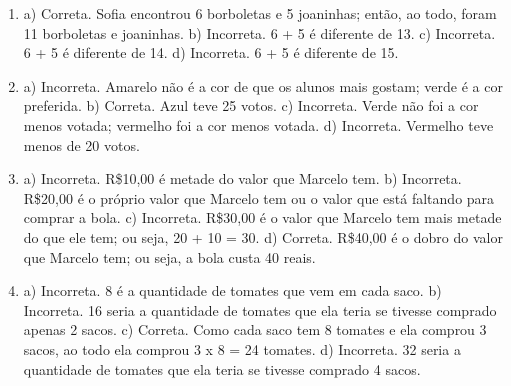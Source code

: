 \begin{enumerate}
\item
a) Correta. Sofia encontrou 6 borboletas e 5 joaninhas; então, ao todo, foram 11 borboletas e joaninhas.
b) Incorreta. 6 + 5 é diferente de 13.
c) Incorreta. 6 + 5 é diferente de 14.
d) Incorreta. 6 + 5 é diferente de 15.

\item
a) Incorreta. Amarelo não é a cor de que os alunos mais gostam; verde é a cor preferida.
b) Correta. Azul teve 25 votos.
c) Incorreta. Verde não foi a cor menos votada; vermelho foi a cor menos votada.
d) Incorreta. Vermelho teve menos de 20 votos.

\item
a) Incorreta. R\$10,00 é metade do valor que Marcelo tem.
b) Incorreta. R\$20,00 é o próprio valor que Marcelo tem ou o valor que
está faltando para comprar a bola.
c) Incorreta. R\$30,00 é o valor que Marcelo tem mais metade do que ele
tem; ou seja, 20 + 10 = 30.
d) Correta. R\$40,00 é o dobro do valor que Marcelo tem; ou seja, a bola
custa 40 reais.

\item
a) Incorreta. 8 é a quantidade de tomates que vem em cada saco.
b) Incorreta. 16 seria a quantidade de tomates que ela teria se tivesse comprado apenas 2 sacos.
c) Correta. Como cada saco tem 8 tomates e ela comprou 3 sacos, ao todo ela comprou 3 x 8 = 24 tomates.
d) Incorreta. 32 seria a quantidade de tomates que ela teria se tivesse comprado 4 sacos.
\end{enumerate}


